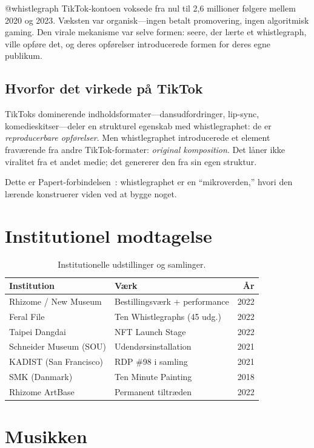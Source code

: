 \documentclass[10pt,letterpaper,twocolumn]{article}
\begin{document}
@whistlegraph TikTok-kontoen voksede fra nul til 2,6 millioner følgere mellem 2020 og 2023. Væksten var organisk---ingen betalt promovering, ingen algoritmisk gaming. Den virale mekanisme var selve formen: seere, der lærte et whistlegraph, ville opføre det, og deres opførelser introducerede formen for deres egne publikum.

\subsection{Hvorfor det virkede på TikTok}

TikToks dominerende indholdsformater---dansudfordringer, lip-sync, komedieskitser---deler en strukturel egenskab med whistlegraphet: de er \emph{reproducerbare opførelser}. Men whistlegraphet introducerede et element fraværende fra andre TikTok-formater: \emph{original komposition}. Det låner ikke viralitet fra et andet medie; det genererer den fra sin egen struktur.

Dette er Papert-forbindelsen~\citep{papert1980mindstorms}: whistlegraphet er en ``mikroverden,'' hvori den lærende konstruerer viden ved at bygge noget.

\section{Institutionel modtagelse}

\begin{table}[h]
\small\centering
\begin{tabularx}{\columnwidth}{Xlr}
\toprule
\textbf{Institution} & \textbf{Værk} & \textbf{År} \\
\midrule
Rhizome / New Museum & Bestillingsværk + performance & 2022 \\
Feral File & Ten Whistlegraphs (45 udg.) & 2022 \\
Taipei Dangdai & NFT Launch Stage & 2022 \\
Schneider Museum (SOU) & Udendørsinstallation & 2021 \\
KADIST (San Francisco) & RDP \#98 i samling & 2021 \\
SMK (Danmark) & Ten Minute Painting & 2018 \\
Rhizome ArtBase & Permanent tiltræden & 2022 \\
\bottomrule
\end{tabularx}
\caption{Institutionelle udstillinger og samlinger.}
\label{tab:institutions}
\end{table}

\section{Musikken}
\end{document}
